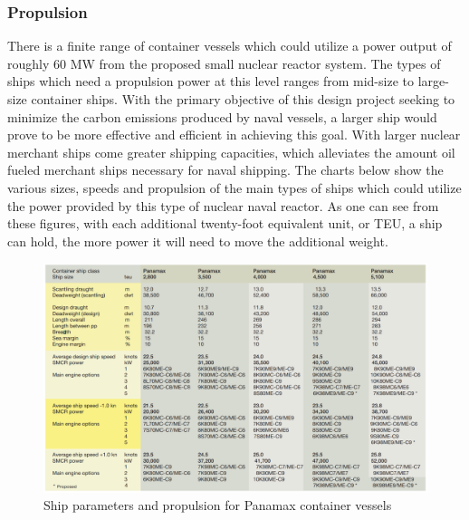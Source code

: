\documentclass[12pt]{article}
\begin{document}
\subsubsection{Propulsion}

There is a finite range of container vessels which could utilize a power output of roughly 60 MW from the proposed small nuclear reactor system. The types of ships which need a propulsion power at this level ranges from mid-size to large-size container ships. With the primary objective of this design project seeking to minimize the carbon emissions produced by naval vessels, a larger ship would prove to be more effective and efficient in achieving this goal. With larger nuclear merchant ships come greater shipping capacities, which alleviates the amount oil fueled merchant ships necessary for naval shipping. The charts below show the various sizes, speeds and propulsion of the main types of ships which could utilize the power provided by this type of nuclear naval reactor. As one can see from these figures, with each additional twenty-foot equivalent unit, or TEU, a ship can hold, the more power it will need to move the additional weight.

\begin{figure}[H]                                  
    \centering                                     
    \includegraphics[width=\textwidth]{PropulsionPanamax}
    \caption{Ship parameters and propulsion for Panamax container vessels \cite{propul}}     
    \label{fig:1ship}     
\end{figure}
\end{document}
